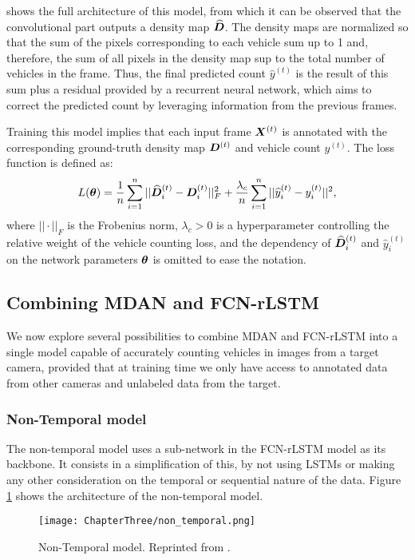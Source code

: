  shows the full architecture of this model, from which it can be observed that the convolutional part outputs a density map $\widehat{{\bm{D}}}$. The density maps are normalized so that the sum of the pixels corresponding to each vehicle sum up to 1 and, therefore, the sum of all pixels in the density map sup to the total number of vehicles in the frame. Thus, the final predicted count $\widehat{y}^{(t)}$ is the result of this sum plus a residual provided by a recurrent neural network, which aims to correct the predicted count by leveraging information from the previous frames.

Training this model implies that each input frame ${\bm{X}}^{(t)}$ is annotated with the corresponding ground-truth density map ${\bm{D}}^{(t)}$ and vehicle count $y^{(t)}$. The loss function is defined as:
\begin{equation}
	L({\bm{\theta}}) = \frac{1}{n} \sum_{i=1}^{n} ||\widehat{{\bm{D}}}^{(t)}_i - {\bm{D}}^{(t)}_i||^2_F + \frac{\lambda_c}{n} \sum_{i=1}^{n} ||\widehat{y}^{(t)}_i - y^{(t)}_i||^2,
\end{equation}
where $||\cdot||_F$ is the Frobenius norm, $\lambda_c > 0$ is a hyperparameter controlling the relative weight of the vehicle counting loss, and the dependency of $\widehat{{\bm{D}}}^{(t)}_i$ and $\hat{y}^{(t)}_i$ on the network parameters ${\bm{\theta}}$ is omitted to ease the notation.

\subsection{Combining MDAN and FCN-rLSTM}
\label{sec:mdan_fcn_rlstm}
We now explore several possibilities to combine MDAN and FCN-rLSTM into a single model capable of accurately counting vehicles in images from a target camera, provided that at training time we only have access to annotated data from other cameras and unlabeled data from the target.

\subsubsection{Non-Temporal model}
The non-temporal model uses a sub-network in the FCN-rLSTM model as its backbone. It consists in a simplification of this, by not using LSTMs or making any other consideration on the temporal or sequential nature of the data. Figure \ref{fig:non_temporal_model} shows the architecture of the non-temporal model.

\begin{figure}[!ht]
	\centering
	\texttt{[image: ChapterThree/non\_temporal.png]}
	\caption{Non-Temporal model. Reprinted from \citet{ThesisFrancisco}.}
	\label{fig:non_temporal_model}
\end{figure}

